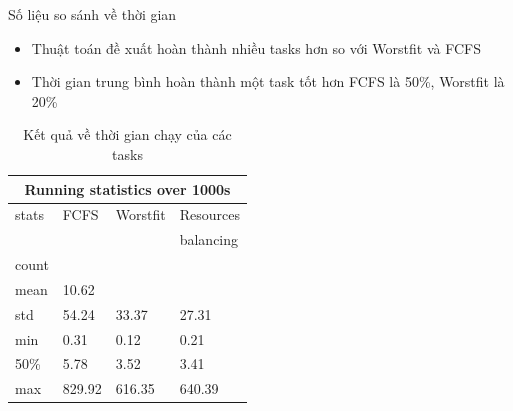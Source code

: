 \documentclass[11pt,xcolor={dvipsnames}, aspectratio=169]{beamer}
\begin{document}
\begin{frame}
{Số liệu so sánh về thời gian}

	\begin{minipage}[t]{0.4\linewidth}
		\vspace{1.5cm}
		\begin{itemize}
			\item Thuật toán đề xuất hoàn thành nhiều tasks hơn so với Worstfit và FCFS
			\item Thời gian trung bình hoàn thành một task tốt hơn FCFS là 50\%, Worstfit là 20\%
		\end{itemize}
	\end{minipage}
	\hfill
	\begin{minipage}[t]{0.59\linewidth}
\begin{table}[h!]
	\centering
	\caption{Kết quả về thời gian chạy của các tasks}
	\begin{tabular}{|p{1.5cm}| p{1.5cm} | p{1.5cm} | p{1.6cm}|}
		\hline
		\multicolumn{4}{|c|}{Running statistics over 1000s} \\
		\hline
		stats & FCFS & Worstfit & Resources \\
			&	&	& balancing \\
		\hline
		\hline
		count&\color{red}{13214}&\color{red}{13925}&\color{red}{14235} \\
		\hline
		mean&\color{blue}10.62&\color{blue}{6.34}&\color{blue}{5.42}\\
		\hline
		std&54.24&33.37&27.31 \\
		\hline
		min&0.31&0.12&0.21 \\
		\hline
		50\%&5.78&3.52&3.41 \\
		\hline
		max&829.92&616.35&640.39 \\
		\hline
	\end{tabular}
	\label{table:finished_tasks}
\end{table}
	\end{minipage}
\end{frame}
\end{document}
